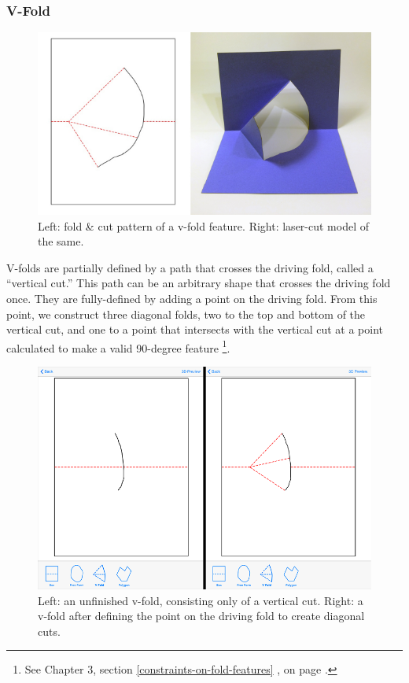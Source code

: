 \subsubsection{V-Fold}\label{v-fold}

\begin{figure}[htbp]
\centering
\includegraphics{figures/33_UI_Interface_Data_Structures/v.pdf}
\caption{Left: fold \& cut pattern of a v-fold feature. Right: laser-cut
model of the same.}
\end{figure}

V-folds are partially defined by a path that crosses the driving fold,
called a ``vertical cut.'' This path can be an arbitrary shape that
crosses the driving fold once. They are fully-defined by adding a point
on the driving fold. From this point, we construct three diagonal folds,
two to the top and bottom of the vertical cut, and one to a point that
intersects with the vertical cut at a point calculated to make a valid
90-degree feature \footnote{See Chapter 3, section
  \ref{constraints-on-fold-features} ,
   on page
  \pageref{geometric-constraints}.}.

\begin{figure}[htbp]
\centering
\includegraphics{figures/33_UI_Interface_Data_Structures/vfold_before_after.png}
\caption{Left: an unfinished v-fold, consisting only of a vertical cut.
Right: a v-fold after defining the point on the driving fold to create
diagonal cuts.}
\end{figure}

